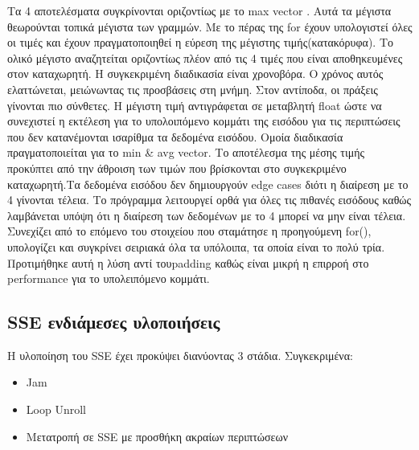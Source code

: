 \documentclass[11pt]{article}
\begin{document}
Τα 4 αποτελέσματα συγκρίνονται οριζοντίως με το max vector . Αυτά τα μέγιστα θεωρούνται τοπικά μέγιστα των γραμμών.  Με το πέρας της for  έχουν υπολογιστεί όλες οι τιμές και έχουν πραγματοποιηθεί η εύρεση της μέγιστης τιμής(κατακόρυφα). Το ολικό μέγιστο αναζητείται οριζοντίως πλέον από τις 4 τιμές που είναι αποθηκευμένες στον καταχωρητή. Η συγκεκριμένη διαδικασία είναι χρονοβόρα. Ο χρόνος αυτός ελαττώνεται, μειώνωντας τις προσβάσεις στη μνήμη. Στον αντίποδα, οι πράξεις γίνονται πιο σύνθετες.
 H μέγιστη τιμή αντιγράφεται σε μεταβλητή float
 ώστε να συνεχιστεί η εκτέλεση για το υπολοιπόμενο κομμάτι της εισόδου για τις περιπτώσεις που δεν κατανέμονται ισαρίθμα τα δεδομένα εισόδου. Ομοία διαδικασία πραγματοποιείται για το min \& avg vector.  Το αποτέλεσμα της μέσης τιμής προκύπτει από την άθροιση των τιμών που βρίσκονται στο συγκεκριμένο καταχωρητή.Τα δεδομένα εισόδου δεν δημιουργούν edge cases διότι η διαίρεση με το 4 γίνονται τέλεια. Το πρόγραμμα λειτουργεί ορθά για όλες τις πιθανές εισόδους καθώς λαμβάνεται υπόψη ότι η διαίρεση των δεδομένων με το 4 μπορεί να μην είναι τέλεια. Συνεχίζει από το επόμενο του στοιχείου που σταμάτησε η προηγούμενη for(), υπολογίζει και συγκρίνει σειριακά όλα τα υπόλοιπα, τα οποία είναι το πολύ τρία. Προτιμήθηκε αυτή η λύση αντί τουpadding  καθώς είναι μικρή η επιρροή στο performance για το υπολειπόμενο κομμάτι.

\vspace{10mm}

\subsection{ SSE  ενδιάμεσες υλοποιήσεις}
Η υλοποίηση του  SSE  έχει προκύψει διανύοντας 3 στάδια.
Συγκεκριμένα:
\begin{itemize}
\item Jam
\item Loop Unroll
\item Μετατροπή σε SSE  με προσθήκη ακραίων περιπτώσεων
\end{itemize} 
\end{document}
